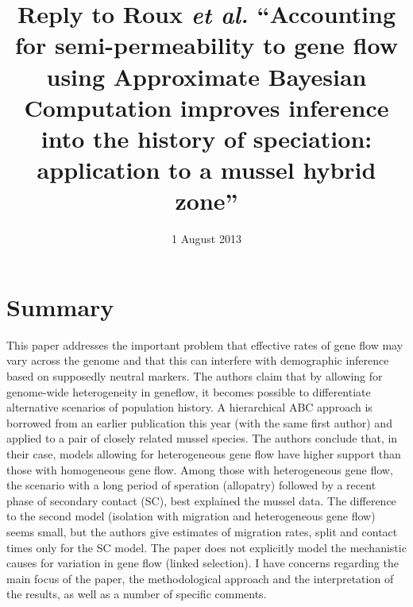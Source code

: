 \documentclass[11pt]{article}
\title{Reply to Roux \emph{et al.} ``Accounting for semi-permeability to gene flow using Approximate Bayesian Computation improves inference into the history of speciation: application to a mussel hybrid zone''}
\date{1 August 2013}                                           %
\begin{document}
\maketitle

\section{Summary}
This paper addresses the important problem that effective rates of gene flow may vary across the genome and that this can interfere with demographic inference based on supposedly neutral markers. The authors claim that by allowing for genome-wide heterogeneity in geneflow, it becomes possible to differentiate alternative scenarios of population history. A hierarchical ABC approach is borrowed from an earlier publication this year (with the same first author) and applied to a pair of closely related mussel species. The authors conclude that, in their case, models allowing for heterogeneous gene flow have higher support than those with homogeneous gene flow. Among those with heterogeneous gene flow, the scenario with a long period of speration (allopatry) followed by a recent phase of secondary contact (SC), best explained the mussel data. The difference to the second model (isolation with migration and heterogeneous gene flow) seems small, but the authors give estimates of migration rates, split and contact times only for the SC model. The paper does not explicitly model the mechanistic causes for variation in gene flow (linked selection). I have concerns regarding the main focus of the paper, the methodological approach and the interpretation of the results, as well as a number of specific comments. 
\end{document}
